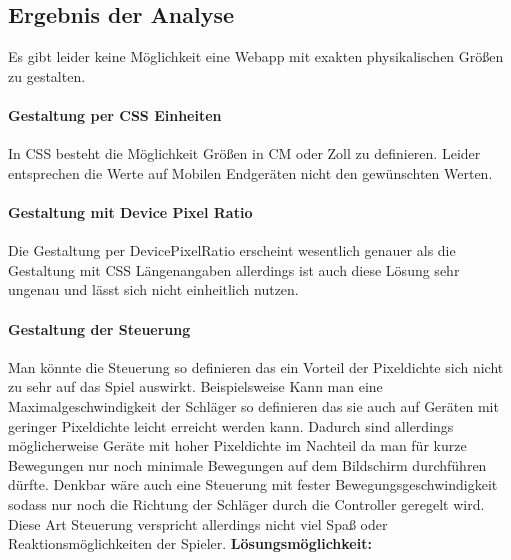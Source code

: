 \subsection{Ergebnis der Analyse}
Es gibt leider keine Möglichkeit eine Webapp mit exakten physikalischen Größen zu gestalten.
\paragraph{Gestaltung per CSS Einheiten} In CSS besteht die Möglichkeit Größen in CM oder Zoll zu definieren. Leider entsprechen die Werte auf Mobilen Endgeräten nicht den gewünschten Werten.
\paragraph{Gestaltung mit Device Pixel Ratio} Die Gestaltung per DevicePixelRatio erscheint wesentlich genauer als die Gestaltung mit CSS Längenangaben allerdings ist auch diese Lösung sehr ungenau und lässt sich nicht einheitlich nutzen. 
\paragraph{Gestaltung der Steuerung} Man könnte die Steuerung so definieren das ein Vorteil der Pixeldichte sich nicht zu sehr auf das Spiel auswirkt. Beispielsweise Kann man eine Maximalgeschwindigkeit der Schläger so definieren das sie auch auf Geräten mit geringer Pixeldichte leicht erreicht werden kann. Dadurch sind allerdings möglicherweise Geräte mit hoher Pixeldichte im Nachteil da man für kurze Bewegungen nur noch minimale Bewegungen auf dem Bildschirm durchführen dürfte.
\newline
Denkbar wäre auch eine Steuerung mit fester Bewegungsgeschwindigkeit sodass nur noch die Richtung der Schläger durch die Controller geregelt wird. Diese Art Steuerung verspricht allerdings nicht viel Spaß oder Reaktionsmöglichkeiten der Spieler.
\newline
\newline
\textbf{Lösungsmöglichkeit:}
